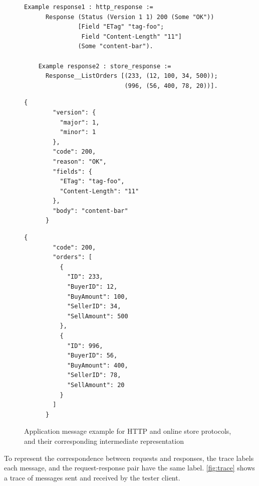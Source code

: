 \begin{figure}
  \begin{lstlisting}[style=customcoq]
    Example response1 : http_response :=
      Response (Status (Version 1 1) 200 (Some "OK"))
               [Field "ETag" "tag-foo";
                Field "Content-Length" "11"]
               (Some "content-bar").

    Example response2 : store_response :=
      Response__ListOrders [(233, (12, 100, 34, 500));
                            (996, (56, 400, 78, 20))].
  \end{lstlisting}
  \begin{minipage}[t]{.4\textwidth}
    \begin{lstlisting}[style=json]
      {
        "version": {
          "major": 1,
          "minor": 1
        },
        "code": 200,
        "reason": "OK",
        "fields": {
          "ETag": "tag-foo",
          "Content-Length": "11"
        },
        "body": "content-bar"
      }
    \end{lstlisting}
  \end{minipage}%
  \begin{minipage}[t]{.4\textwidth}
    \begin{lstlisting}[style=json]
      {
        "code": 200,
        "orders": [
          {
            "ID": 233,
            "BuyerID": 12,
            "BuyAmount": 100,
            "SellerID": 34,
            "SellAmount": 500
          },
          {
            "ID": 996,
            "BuyerID": 56,
            "BuyAmount": 400,
            "SellerID": 78,
            "SellAmount": 20
          }
        ]
      }
    \end{lstlisting}
  \end{minipage}
  \caption{Application message example for HTTP and online store protocols, and
    their corresponding intermediate representation}
  \label{fig:ir}
\end{figure}

To represent the correspondence between requests and responses, the trace labels
each message, and the request-response pair have the same label.
\autoref{fig:trace} shows a trace of messages sent and received by the tester
client.

